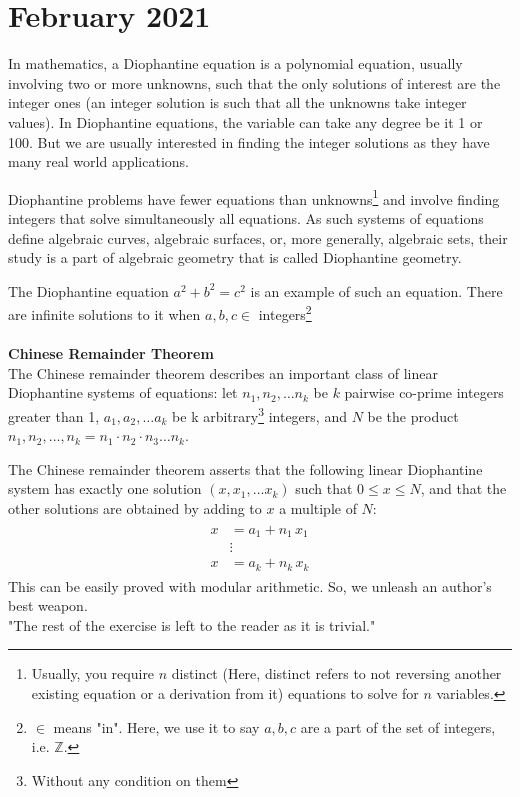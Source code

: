 \section{February 2021}
\newpage
\begin{mathbox}{}
{In mathematics, a Diophantine equation is a polynomial equation, usually involving two or more unknowns, such that the only solutions of interest are the integer ones (an integer solution is such that all the unknowns take integer values). In Diophantine equations, the variable can take any degree be it 1 or 100. But we are usually interested in finding the integer solutions as they have many real world applications.

Diophantine problems have fewer equations than unknowns\footnote{Usually, you require $n$ distinct (Here, distinct refers to not reversing another existing equation or a derivation from it) equations to solve for $n$ variables.} and involve finding integers that solve simultaneously all equations. As such systems of equations define algebraic curves, algebraic surfaces, or, more generally, algebraic sets, their study is a part of algebraic geometry that is called Diophantine geometry.

The Diophantine equation $a^2 + b^2 = c^2$ is an example of such an equation. There are infinite solutions to it when $a,b,c \in$ integers\footnote{$\in$ means "in". Here, we use it to say $a,b,c$ are a part of the set of integers, i.e. $\mathbb{Z}$.}
\\\\
\textbf{Chinese Remainder Theorem}\\
The Chinese remainder theorem describes an important class of linear Diophantine systems of equations: let $n_1, n_2, \dots n_k$ be $k$ pairwise co-prime integers greater than 1, $a_1, a_2, \dots a_k$ be k arbitrary\footnote{Without any condition on them} integers, and $N$ be the product $n_1, n_2, \dots, n_k = n_1 \cdot n_2 \cdot n_3 \dots n_k$. 

The Chinese remainder theorem asserts that the following linear Diophantine system has exactly one solution $(x, x_1, \dots x_k)$ such that $0 \leq x \leq N$, and that the other solutions are obtained by adding to $x$ a multiple of $N$:
\begin{align*}
    {\displaystyle {\begin{aligned}x&=a_{1}+n_{1}\,x_{1}\\&\vdots \\x&=a_{k}+n_{k}\,x_{k}\end{aligned}}}
\end{align*}
This can be easily proved with modular arithmetic. So, we unleash an author's best weapon.\\"The rest of the exercise is left to the reader as it is {trivial}."}
\end{mathbox}
